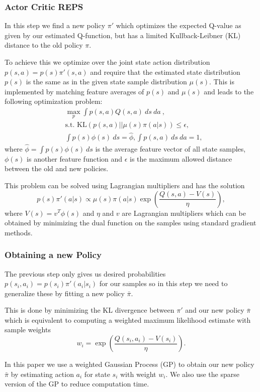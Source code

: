 \documentclass[twoside]{article}
\begin{document}
\subsubsection{Actor Critic REPS}
In this step we find a new policy $\pi'$ which optimizes the expected Q-value
as given by our estimated Q-function, but has a limited Kullback-Leibner (KL)
distance to the old policy $\pi$.

To achieve this we optimize over the joint state action distribution
$p(s,a) = p(s) \pi'(s, a)$ and require that the estimated state distribution
$p(s)$ is the same as in the given state sample distribution $\mu(s)$.
This is implemented by matching feature averages of $p(s)$ and $\mu(s)$ and
leads to the following optimization problem:
\begin{align*}
    & \max_p \int p(s, a)Q(s, a)\:ds\:da\:, \\
    & \text{s.t. } \text{KL}(p(s, a) || \mu(s)\pi(a|s)) \leq \epsilon,\\
    & \int p(s)\phi(s)\:ds = \hat{\phi}, \int p(s, a)\:ds\:da = 1,
\end{align*}
where $\hat{\phi} = \int p(s) \phi(s)\:ds$ is the average feature vector of all
state samples, $\phi(s)$ is another feature function and $\epsilon$ is the
maximum allowed distance between the old and new policies.

This problem can be solved using Lagrangian multipliers and has the solution
$$
p(s)\pi'(a|s) \propto \mu(s) \pi(a|s) \exp\left(\frac{Q(s,a) - V(s)}{\eta}\right),
$$
where $V(s) = v^T \phi(s)$ and $\eta$ and $v$ are Lagrangian multipliers which
can be obtained by minimizing the dual function on the samples using standard
gradient methods.

\subsubsection{Obtaining a new Policy}
The previous step only gives us desired probabilities
$p(s_i, a_i) = p(s_i) \pi'(a_i|s_i)$ for our samples so in this step we need
to generalize these by fitting a new policy $\bar{\pi}$.

This is done by minimizing the KL divergence between $\pi'$ and our new policy
$\bar{\pi}$ which is equivalent to computing a weighted maximum likelihood
estimate with sample weights
$$ w_i = \exp\left(\frac{Q(s_i, a_i) - V(s_i)}{\eta}\right). $$

In this paper we use a weighted Gaussian Process (GP) to obtain our new policy
$\bar{\pi}$ by estimating action $a_i$ for state $s_i$ with weight $w_i$. We
also use the sparse version of the GP to reduce computation time.
\end{document}
